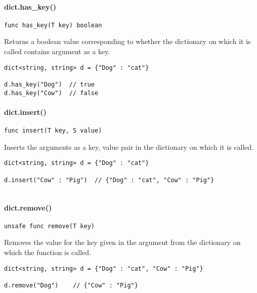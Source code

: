 \documentclass[]{article}
\begin{document}
\paragraph{dict.has\_key()}\label{dict.hasux5fkey}

\begin{verbatim}
func has_key(T key) boolean
\end{verbatim}

Returns a boolean value corresponding to whether the dictionary on which
it is called contains argument as a key.

\begin{verbatim}
dict<string, string> d = {"Dog" : "cat"}

d.has_key("Dog")  // true
d.has_key("Cow")  // false
\end{verbatim}

\paragraph{dict.insert()}\label{dict.insert}

\begin{verbatim}
func insert(T key, S value)
\end{verbatim}

Inserts the arguments as a key, value pair in the dictionary on which it
is called.

\begin{verbatim}
dict<string, string> d = {"Dog" : "cat"}

d.insert("Cow" : "Pig")  // {"Dog" : "cat", "Cow" : "Pig"}
 
\end{verbatim}

\paragraph{dict.remove()}\label{dict.remove}

\begin{verbatim}
unsafe func remove(T key)
\end{verbatim}

Removes the value for the key given in the argument from the dictionary
on which the function is called.

\begin{verbatim}
dict<string, string> d = {"Dog" : "cat", "Cow" : "Pig"}

d.remove("Dog")    // {"Cow" : "Pig"}
\end{verbatim}
\end{document}
